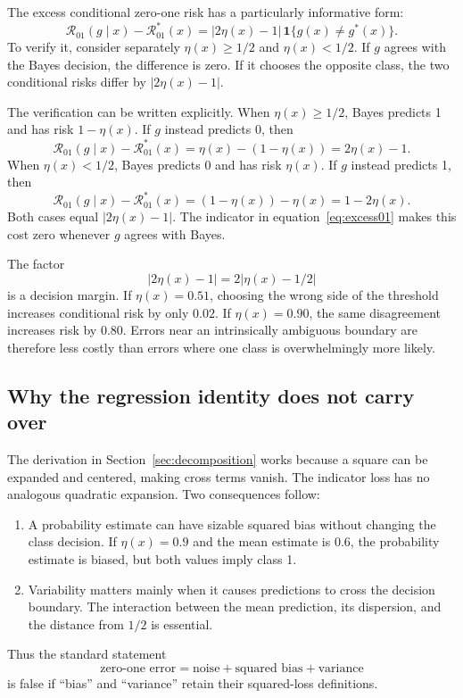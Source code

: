 \documentclass[11pt,a4paper]{article}
\newcommand{\R}{\mathcal R}
\newcommand{\ind}{\mathbf{1}}
\begin{document}
The excess conditional zero-one risk has a particularly informative form:
\begin{equation}
  \R_{01}(g\mid x)-\R_{01}^{*}(x)
  =|2\eta(x)-1|\,\ind\{g(x)\neq g^{*}(x)\}.
  \label{eq:excess01}
\end{equation}
To verify it, consider separately $\eta(x)\geq 1/2$ and $\eta(x)<1/2$. If $g$ agrees with the Bayes decision, the difference is zero. If it chooses the opposite class, the two conditional risks differ by $|2\eta(x)-1|$.

The verification can be written explicitly. When $\eta(x)\geq 1/2$, Bayes predicts 1 and has risk $1-\eta(x)$. If $g$ instead predicts 0, then
\begin{equation*}
  \R_{01}(g\mid x)-\R_{01}^{*}(x)
  =\eta(x)-(1-\eta(x))
  =2\eta(x)-1.
\end{equation*}
When $\eta(x)<1/2$, Bayes predicts 0 and has risk $\eta(x)$. If $g$ instead predicts 1, then
\begin{equation*}
  \R_{01}(g\mid x)-\R_{01}^{*}(x)
  =(1-\eta(x))-\eta(x)
  =1-2\eta(x).
\end{equation*}
Both cases equal $|2\eta(x)-1|$. The indicator in equation~\eqref{eq:excess01} makes this cost zero whenever $g$ agrees with Bayes.

The factor
\begin{equation}
  |2\eta(x)-1|=2|\eta(x)-1/2|
\end{equation}
is a decision margin. If $\eta(x)=0.51$, choosing the wrong side of the threshold increases conditional risk by only $0.02$. If $\eta(x)=0.90$, the same disagreement increases risk by $0.80$. Errors near an intrinsically ambiguous boundary are therefore less costly than errors where one class is overwhelmingly more likely.

\subsection{Why the regression identity does not carry over}

The derivation in Section~\ref{sec:decomposition} works because a square can be expanded and centered, making cross terms vanish. The indicator loss has no analogous quadratic expansion. Two consequences follow:
\begin{enumerate}
  \item A probability estimate can have sizable squared bias without changing the class decision. If $\eta(x)=0.9$ and the mean estimate is $0.6$, the probability estimate is biased, but both values imply class 1.
  \item Variability matters mainly when it causes predictions to cross the decision boundary. The interaction between the mean prediction, its dispersion, and the distance from $1/2$ is essential.
\end{enumerate}
Thus the standard statement
\begin{equation*}
  \text{zero-one error}=\text{noise}+\text{squared bias}+\text{variance}
\end{equation*}
is false if ``bias'' and ``variance'' retain their squared-loss definitions.
\end{document}
